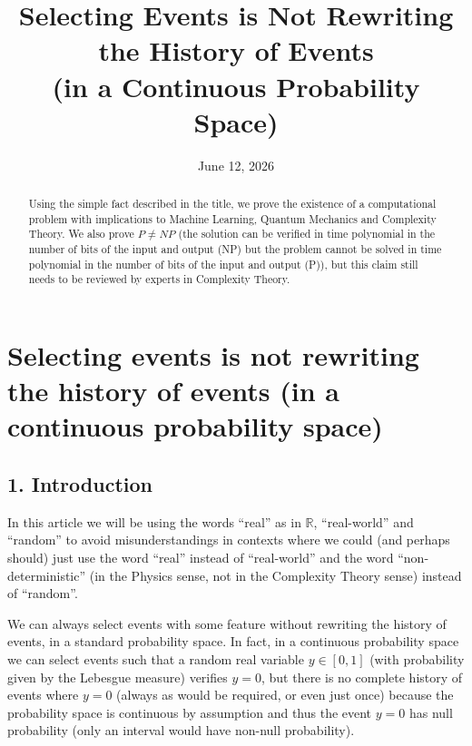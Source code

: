 \documentclass[11pt,a4paper]{report}
\begin{document}
\title{Selecting Events is Not Rewriting the History of Events\\(in a Continuous Probability Space)}
\author{}
\date{June 12, 2026}
\maketitle

\begin{abstract}
Using the simple fact described in the title, we prove the existence of
a computational problem with implications to Machine Learning, Quantum
Mechanics and Complexity Theory. We also prove $P \neq NP$ (the solution can
be verified in time polynomial in the number of bits of the input and
output (NP) but the problem cannot be solved in time polynomial in the
number of bits of the input and output (P)), but this claim still needs
to be reviewed by experts in Complexity Theory.
\end{abstract}

\chapter{Selecting events is not rewriting the history of events (in a continuous probability space)}


\hypertarget{introduction}{%
\section{1. Introduction}\label{introduction}}

In this article we will be using the words ``real'' as in
\(\mathbb{R}\), ``real-world'' and ``random'' to avoid misunderstandings
in contexts where we could (and perhaps should) just use the word
``real'' instead of ``real-world'' and the word ``non-deterministic''
(in the Physics sense, not in the Complexity Theory sense) instead of
``random''.

We can always select events with some feature without rewriting the
history of events, in a standard probability space. In fact, in a
continuous probability space we can select events such that a random
real variable \(y\in [0,1]\) (with probability given by the Lebesgue
measure) verifies \(y=0\), but there is no complete history of events
where \(y=0\) (always as would be required, or even just once) because
the probability space is continuous by assumption and thus the event
\(y=0\) has null probability (only an interval would have non-null
probability).
\end{document}
